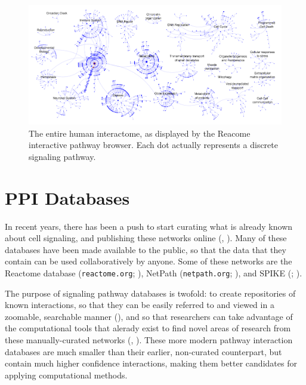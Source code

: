 \documentclass[12pt,twoside]{reedthesis}
\theoremstyle{definition}
\begin{document}
\begin{figure}[h]
  \begin{center}
    \includegraphics[width=\textwidth]{human_interactome}
  \caption[Human interactome]{The entire human interactome, as displayed by the Reacome interactive pathway browser. Each dot actually represents a discrete signaling pathway.}
  \label{fig:human_interactome}
  \end{center}
\end{figure}

\section{PPI Databases}

In recent years, there has been a push to start curating what is already known about cell signaling, and publishing these networks online (\cite{Bauer-Mehren2009}, \cite{Cusick2009}). Many of these databases have been made available to the public, so that the data that they contain can be used collaboratively by anyone. Some of these networks are the Reactome database (\texttt{reactome.org}; \cite{Matthews2009}), NetPath (\texttt{netpath.org}; \cite{Kandasamy2010}), and SPIKE (; \cite{Paz2011}).\par
The purpose of signaling pathway databases is twofold: to create repositories of known interactions, so that they can be easily referred to and viewed in a zoomable, searchable manner (\cite{Hu2007}), and so that researchers can take advantage of the computational tools that alerady exist to find novel areas of research from these manually-curated networks (\cite{Karlebach2008}, \cite{Battle2010}). These more modern pathway interaction databases are much smaller than their earlier, non-curated counterpart, but contain much higher confidence interactions, making them better candidates for applying computational methods.\par
\end{document}
